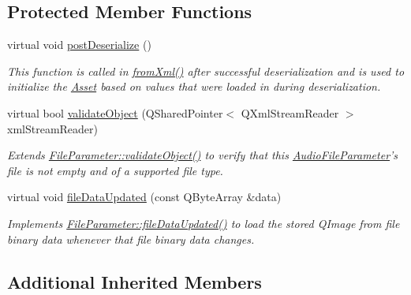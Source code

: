\subsection*{Protected Member Functions}
\begin{DoxyCompactItemize}
\item 
virtual void \hyperlink{class_picto_1_1_image_file_parameter_a6a60bb4aa2f72c20c534b3ffc08dc8cc}{post\-Deserialize} ()
\begin{DoxyCompactList}\small\item\em This function is called in \hyperlink{class_picto_1_1_asset_a8bed4da09ecb1c07ce0dab313a9aba67}{from\-Xml()} after successful deserialization and is used to initialize the \hyperlink{class_picto_1_1_asset}{Asset} based on values that were loaded in during deserialization. \end{DoxyCompactList}\item 
\hypertarget{class_picto_1_1_image_file_parameter_aafb5a4fd1059db86aaf754b0948f2847}{virtual bool \hyperlink{class_picto_1_1_image_file_parameter_aafb5a4fd1059db86aaf754b0948f2847}{validate\-Object} (Q\-Shared\-Pointer$<$ Q\-Xml\-Stream\-Reader $>$ xml\-Stream\-Reader)}\label{class_picto_1_1_image_file_parameter_aafb5a4fd1059db86aaf754b0948f2847}

\begin{DoxyCompactList}\small\item\em Extends \hyperlink{class_picto_1_1_file_parameter_ac8e70960eed0516f77c731a415b364be}{File\-Parameter\-::validate\-Object()} to verify that this \hyperlink{class_picto_1_1_audio_file_parameter}{Audio\-File\-Parameter}'s file is not empty and of a supported file type. \end{DoxyCompactList}\item 
virtual void \hyperlink{class_picto_1_1_image_file_parameter_a71e97959059c9a356d34c23891545de8}{file\-Data\-Updated} (const Q\-Byte\-Array \&data)
\begin{DoxyCompactList}\small\item\em Implements \hyperlink{class_picto_1_1_file_parameter_ae16da57fb69a636ec2322470dc5e4c69}{File\-Parameter\-::file\-Data\-Updated()} to load the stored Q\-Image from file binary data whenever that file binary data changes. \end{DoxyCompactList}\end{DoxyCompactItemize}
\subsection*{Additional Inherited Members}


